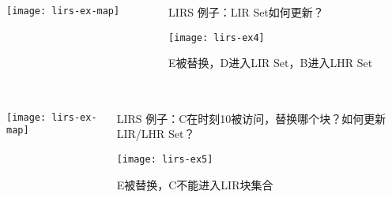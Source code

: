 \begin{frame}[plain]
	\frametitle{ }
	\begin{columns}
		\begin{column}{.4\textwidth}
			\centering
			\texttt{[image: lirs-ex-map]}
		\end{column}
		
		\begin{column}{.6\textwidth}
			LIRS 例子：LIR Set如何更新？
			
			\texttt{[image: lirs-ex4]}
			
			E被替换，D进入LIR Set，B进入LHR Set 
		\end{column}
		
		
	\end{columns}
\end{frame}


\begin{frame}[plain]
	\frametitle{ }
	\begin{columns}
		\begin{column}{.4\textwidth}
			\centering
			\texttt{[image: lirs-ex-map]}
		\end{column}
		
		\begin{column}{.6\textwidth}
			LIRS 例子：C在时刻10被访问，替换哪个块？如何更新LIR/LHR Set？
			
			\texttt{[image: lirs-ex5]}
			
			\pause
			\centering
			E被替换，C不能进入LIR块集合 
		\end{column}
		
		
	\end{columns}
\end{frame}


